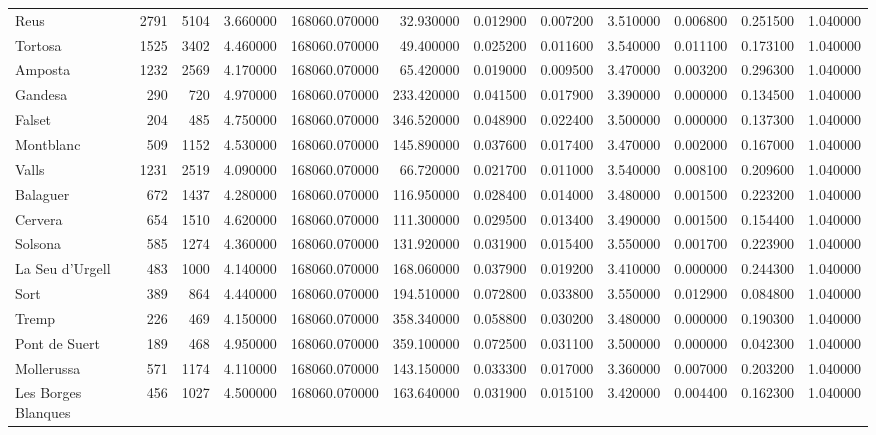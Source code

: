 \documentclass{article}
\begin{document}
\begin{table}[ht]
\begin{tabular}{lrrrrrrrrrrr}
Reus & 2791 & 5104 & 3.660000 & 168060.070000 & 32.930000 & 0.012900 & 0.007200 & 3.510000 & 0.006800 & 0.251500 & 1.040000 \\
Tortosa & 1525 & 3402 & 4.460000 & 168060.070000 & 49.400000 & 0.025200 & 0.011600 & 3.540000 & 0.011100 & 0.173100 & 1.040000 \\
Amposta & 1232 & 2569 & 4.170000 & 168060.070000 & 65.420000 & 0.019000 & 0.009500 & 3.470000 & 0.003200 & 0.296300 & 1.040000 \\
Gandesa & 290 & 720 & 4.970000 & 168060.070000 & 233.420000 & 0.041500 & 0.017900 & 3.390000 & 0.000000 & 0.134500 & 1.040000 \\
Falset & 204 & 485 & 4.750000 & 168060.070000 & 346.520000 & 0.048900 & 0.022400 & 3.500000 & 0.000000 & 0.137300 & 1.040000 \\
Montblanc & 509 & 1152 & 4.530000 & 168060.070000 & 145.890000 & 0.037600 & 0.017400 & 3.470000 & 0.002000 & 0.167000 & 1.040000 \\
Valls & 1231 & 2519 & 4.090000 & 168060.070000 & 66.720000 & 0.021700 & 0.011000 & 3.540000 & 0.008100 & 0.209600 & 1.040000 \\
Balaguer & 672 & 1437 & 4.280000 & 168060.070000 & 116.950000 & 0.028400 & 0.014000 & 3.480000 & 0.001500 & 0.223200 & 1.040000 \\
Cervera & 654 & 1510 & 4.620000 & 168060.070000 & 111.300000 & 0.029500 & 0.013400 & 3.490000 & 0.001500 & 0.154400 & 1.040000 \\
Solsona & 585 & 1274 & 4.360000 & 168060.070000 & 131.920000 & 0.031900 & 0.015400 & 3.550000 & 0.001700 & 0.223900 & 1.040000 \\
La Seu d'Urgell & 483 & 1000 & 4.140000 & 168060.070000 & 168.060000 & 0.037900 & 0.019200 & 3.410000 & 0.000000 & 0.244300 & 1.040000 \\
Sort & 389 & 864 & 4.440000 & 168060.070000 & 194.510000 & 0.072800 & 0.033800 & 3.550000 & 0.012900 & 0.084800 & 1.040000 \\
Tremp & 226 & 469 & 4.150000 & 168060.070000 & 358.340000 & 0.058800 & 0.030200 & 3.480000 & 0.000000 & 0.190300 & 1.040000 \\
Pont de Suert & 189 & 468 & 4.950000 & 168060.070000 & 359.100000 & 0.072500 & 0.031100 & 3.500000 & 0.000000 & 0.042300 & 1.040000 \\
Mollerussa & 571 & 1174 & 4.110000 & 168060.070000 & 143.150000 & 0.033300 & 0.017000 & 3.360000 & 0.007000 & 0.203200 & 1.040000 \\
Les Borges Blanques & 456 & 1027 & 4.500000 & 168060.070000 & 163.640000 & 0.031900 & 0.015100 & 3.420000 & 0.004400 & 0.162300 & 1.040000 \\

\end{tabular}
\end{table}
\end{document}
